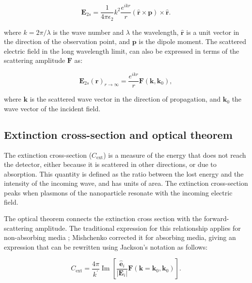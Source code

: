 \begin{equation} \label{eq:scat_efield_long_range}
    \mathbf{E}_{2s} = \frac{1}{4\pi\epsilon_2}k^2\frac{e^{ikr}}{r} (\mathbf{\hat{r}} \times \mathbf{p})\times\mathbf{\hat{r}}.
\end{equation} 

where $k=2\pi/\lambda$ is the wave number and $\lambda$ the wavelength, $\mathbf{\hat{r}}$ 
is a unit vector in the direction of the observation point, and $\mathbf{p}$ is
the dipole moment. 
The scattered electric field in the long wavelength limit, can also be expressed in terms of the 
scattering amplitude $\mathbf{F}$ \cite{Jackson} as:

\begin{equation} \label{eq:scat_efield_fwa}
    \mathbf{E}_{2s}(\mathbf{r})_{r\to\infty} = \frac{e^{ikr}}{r} \mathbf{F}(\mathbf{k},\mathbf{k}_0),
\end{equation}

where $\mathbf{k}$ is the scattered wave vector in the direction of propagation, and $\mathbf{k}_0$ the 
wave vector of the incident field. 

\subsection{Extinction cross-section and optical theorem} \label{sec:cext_ot}

The extinction cross-section ($C_\text{ext}$) is a measure of the energy that 
does not reach the detector, either because it is scattered in other directions,
or due to absorption. This quantity is defined as the ratio between the lost energy and 
the intensity of the incoming wave, and has units of area. The extinction cross-section peaks when
plasmons of the nanoparticle resonate with the incoming electric field.

The optical theorem connects the extinction cross section with the forward-scattering amplitude. The traditional 
expression for this relationship applies for non-absorbing media 
\cite{MayergoyzZhang2007, Jackson}; Mishchenko \cite{Mishchenko2007} corrected it for absorbing media, 
giving an expression that can be rewritten using Jackson's notation \cite{Jackson} as follows:

\begin{equation} \label{eq:cext_fwa}
    C_\text{ext} = \frac{4\pi}{k^\prime} \operatorname{Im} \left[ \frac{\mathbf{\hat{e}}_i}{|\mathbf{E}_i|}\mathbf{F}(\mathbf{k}=\mathbf{k}_0, \mathbf{k}_0) \right].
\end{equation}


